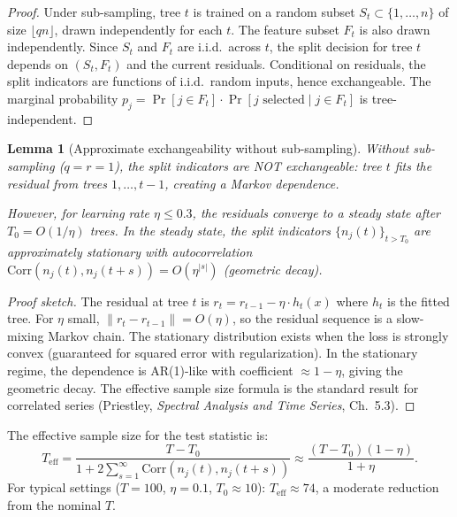 \documentclass{article}
\newtheorem{lemma}[theorem]{Lemma}
\begin{document}
\begin{proof}
Under sub-sampling, tree $t$ is trained on a random subset $S_t \subset \{1, \ldots, n\}$ of size $\lfloor qn \rfloor$, drawn independently for each $t$. The feature subset $F_t$ is also drawn independently. Since $S_t$ and $F_t$ are i.i.d.\ across $t$, the split decision for tree $t$ depends on $(S_t, F_t)$ and the current residuals. Conditional on residuals, the split indicators are functions of i.i.d.\ random inputs, hence exchangeable. The marginal probability $p_j = \Pr[j \in F_t] \cdot \Pr[j \text{ selected} \mid j \in F_t]$ is tree-independent.
\end{proof}

\begin{lemma}[Approximate exchangeability without sub-sampling]
\label{lem:exchange-no-subsample}
Without sub-sampling ($q = r = 1$), the split indicators are NOT exchangeable: tree $t$ fits the residual from trees $1, \ldots, t-1$, creating a Markov dependence.

However, for learning rate $\eta \leq 0.3$, the residuals converge to a \emph{steady state} after $T_0 = O(1/\eta)$ trees. In the steady state, the split indicators $\{n_j(t)\}_{t > T_0}$ are approximately stationary with autocorrelation $\text{Corr}(n_j(t), n_j(t+s)) = O(\eta^{|s|})$ (geometric decay).
\end{lemma}

\begin{proof}[Proof sketch]
The residual at tree $t$ is $r_t = r_{t-1} - \eta \cdot h_t(x)$ where $h_t$ is the fitted tree. For $\eta$ small, $\|r_t - r_{t-1}\| = O(\eta)$, so the residual sequence is a slow-mixing Markov chain. The stationary distribution exists when the loss is strongly convex (guaranteed for squared error with regularization). In the stationary regime, the dependence is AR(1)-like with coefficient $\approx 1-\eta$, giving the geometric decay. The effective sample size formula is the standard result for correlated series (Priestley, \emph{Spectral Analysis and Time Series}, Ch.~5.3).
\end{proof}

The effective sample size for the test statistic is:
\[
    T_{\text{eff}} = \frac{T - T_0}{1 + 2\sum_{s=1}^\infty \text{Corr}(n_j(t), n_j(t+s))} \approx \frac{(T - T_0)(1 - \eta)}{1 + \eta}.
\]
For typical settings ($T = 100$, $\eta = 0.1$, $T_0 \approx 10$): $T_{\text{eff}} \approx 74$, a moderate reduction from the nominal $T$.
\end{document}

